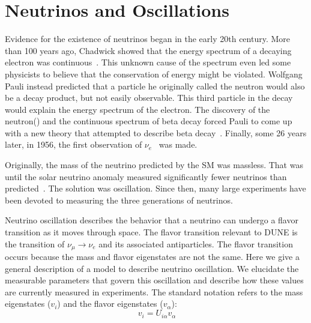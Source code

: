 \section{Neutrinos and Oscillations}
\label{sec:neutrino_oscillation}
Evidence for the existence of neutrinos began in the early 20th century.
More than 100 years ago, Chadwick showed that the energy spectrum of a decaying electron was continuous~\citep{Chadwick:1914zz}.
This unknown cause of the spectrum even led some physicists to believe that the conservation of energy might be violated.
Wolfgang Pauli instead predicted that a particle he originally called the neutron would also be a decay product, but not easily observable.
This third particle in the decay would explain the energy spectrum of the electron.
The discovery of the neutron(\citep{Chadwick1932PossibleEO}) and the continuous spectrum of beta decay forced Pauli to come up with a new theory that attempted to describe beta decay~\citep{pauli_1934}.
Finally, some 26 years later, in 1956, the first observation of $\nu_{e}$~\citep{first_neutrino_measurement} was made.

Originally, the mass of the neutrino predicted by the SM was massless.
That was until the solar neutrino anomaly measured significantly fewer neutrinos than predicted~\citep{solar_neutrino_problem_PhysRevLett.20.1205}.
The solution was oscillation.
Since then, many large experiments have been devoted to measuring the three generations of neutrinos.
~\citep{SNO_2002_neutrino_PhysRevLett.89.011301,
neutrino_measurement_NOvA_2019_prl,
t2k_2011_neutrino_PhysRevLett.107.041801,
reno_2012_neutrino_PhysRevLett.108.191802,
FUKUDA2002_solar_neutrino_oscillation,
kamland_2003_neutrino_PhysRevLett.90.021802,
daya_bay_2012_neutrino_PhysRevLett.108.171803,
PhysRevD.91.072010_t2k_2015,
doubleChooz_2012_neutrino_PhysRevLett.108.131801}

Neutrino oscillation describes the behavior that a neutrino can undergo a flavor transition as it moves through space.
The flavor transition relevant to DUNE is the transition of $\nu_{\mu}\rightarrow \nu_{e}$ and its associated antiparticles. 
The flavor transition occurs because the mass and flavor eigenstates are not the same.
Here we give a general description of a model to describe neutrino oscillation.
We elucidate the measurable parameters that govern this oscillation and describe how these values are currently measured in experiments.
The standard notation refers to the mass eigenstates ($v_{i}$) and the flavor eigenstates ($v_{\alpha}$):
\begin{equation}~\label{eq:relate_eigenstates}
  v_{i} = U_{i\alpha}v_{\alpha}
\end{equation}


